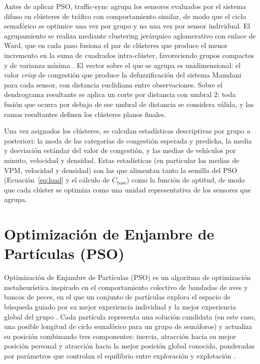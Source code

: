 Antes de aplicar PSO, traffic-sync agrupa los sensores evaluados por el sistema difuso en clústeres de tráfico con comportamiento similar, de modo que el ciclo semafórico se optimice una vez por grupo y no una vez por sensor individual. El agrupamiento se realiza mediante clustering jerárquico aglomerativo con enlace de Ward, que en cada paso fusiona el par de clústeres que produce el menor incremento en la suma de cuadrados intra-clúster, favoreciendo grupos compactos y de varianza mínima \cite{ward1963hierarchical}. El vector sobre el que se agrupa es unidimensional: el valor \emph{crisp} de congestión que produce la defuzzificación del sistema Mamdani para cada sensor, con distancia euclidiana entre observaciones. Sobre el dendrograma resultante se aplica un corte por distancia con umbral $2$: toda fusión que ocurra por debajo de ese umbral de distancia se considera válida, y las ramas resultantes definen los clústeres planos finales.

Una vez asignados los clústeres, se calculan estadísticas descriptivas por grupo a posteriori: la moda de las categorías de congestión esperada y predicha, la media y desviación estándar del valor de congestión, y las medias de vehículos por minuto, velocidad y densidad. Estas estadísticas (en particular las medias de VPM, velocidad y densidad) son las que alimentan tanto la semilla del PSO (Ecuación~\ref{eq:load} y el cálculo de $C_{\text{base}}$) como la función de aptitud, de modo que cada clúster se optimiza como una unidad representativa de los sensores que agrupa.

\section{Optimización de Enjambre de Partículas (PSO)}
\label{subsec:pso_traffic_sync}

Optimización de Enjambre de Partículas (PSO) es un algoritmo de optimización metaheurística inspirado en el comportamiento colectivo de bandadas de aves y bancos de peces, en el que un conjunto de partículas explora el espacio de búsqueda guiado por su mejor experiencia individual y la mejor experiencia global del grupo \cite{kennedy1995particle,eberhart1995new}. Cada partícula representa una solución candidata (en este caso, una posible longitud de ciclo semafórico para un grupo de semáforos) y actualiza su posición combinando tres componentes: inercia, atracción hacia su mejor posición personal y atracción hacia la mejor posición global conocida, ponderadas por parámetros que controlan el equilibrio entre exploración y explotación \cite{clerc2002particle,shi1998parameter}.

